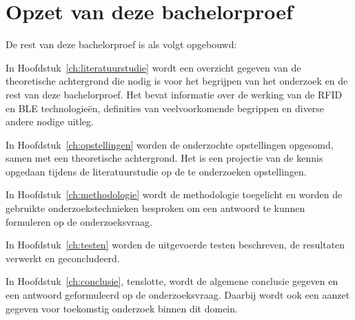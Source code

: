 \section{Opzet van deze bachelorproef}
\label{sec:opzet-bachelorproef}


De rest van deze bachelorproef is als volgt opgebouwd:

In Hoofdstuk~\ref{ch:literatuurstudie} wordt een overzicht gegeven van de theoretische achtergrond die nodig is voor het begrijpen van het onderzoek en de rest van deze bachelorproef. Het bevat informatie over de werking van de RFID en BLE technologieën, definities van veelvoorkomende begrippen en diverse andere nodige uitleg.

In Hoofdstuk~\ref{ch:opstellingen} worden de onderzochte opstellingen opgesomd, samen met een theoretische achtergrond. Het is een projectie van de kennis opgedaan tijdens de literatuurstudie op de te onderzoeken opstellingen.

In Hoofdstuk~\ref{ch:methodologie} wordt de methodologie toegelicht en worden de gebruikte onderzoekstechnieken besproken om een antwoord te kunnen formuleren op de onderzoeksvraag.

In Hoofdstuk~\ref{ch:testen} worden de uitgevoerde testen beschreven, de resultaten verwerkt en geconcludeerd.

In Hoofdstuk~\ref{ch:conclusie}, tenslotte, wordt de algemene conclusie gegeven en een antwoord geformuleerd op de onderzoeksvraag. Daarbij wordt ook een aanzet gegeven voor toekomstig onderzoek binnen dit domein.